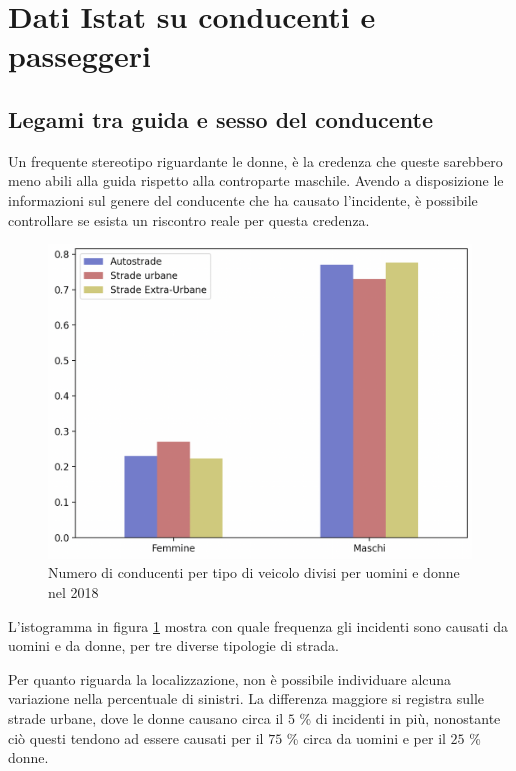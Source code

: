 \documentclass[a4paper,12pt]{report}
\begin{document}
\section{Dati Istat su conducenti e passeggeri}

\subsection{Legami tra guida e sesso del conducente}


Un frequente stereotipo riguardante le donne, è la credenza che queste  
sarebbero meno abili alla guida rispetto alla controparte maschile. 
Avendo a disposizione le informazioni sul genere del conducente che ha causato l'incidente, 
è possibile controllare se esista un riscontro reale per questa credenza. 

\begin{figure}
    \hfill\includegraphics[width=0.7\linewidth]{../src/incidenti/incidenti_senza_coords/tipo_veicoli/uomo-donna.png}\hspace*{\fill}
    \caption{Numero di conducenti per tipo di veicolo divisi per uomini e donne nel 2018}
    \label{fig:differenza-uomo-donna}
\end{figure}

L'istogramma in figura \ref{fig:differenza-uomo-donna} mostra con quale frequenza 
gli incidenti sono causati da uomini e da donne, per tre diverse tipologie di strada. 

Per quanto riguarda la localizzazione, non è possibile individuare alcuna 
variazione nella percentuale di sinistri. 
La differenza maggiore si registra sulle strade urbane, dove le donne causano circa il 
$5$ \% di incidenti in più, nonostante ciò 
questi tendono ad essere causati per il $75$ \% circa da uomini e 
per il $25$ \% donne. 
\end{document}
